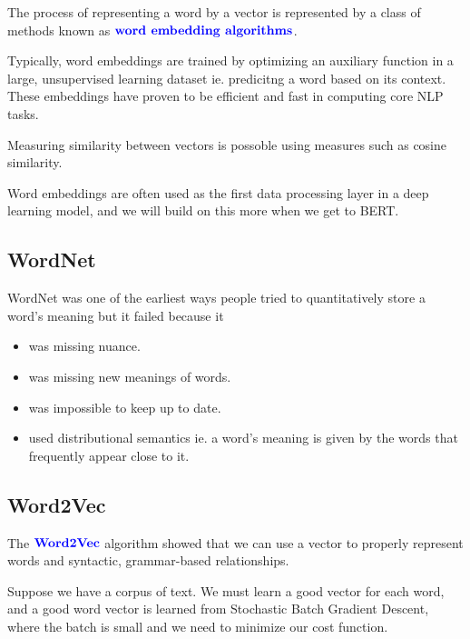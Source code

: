 \documentclass[12pt]{scrartcl}
\begin{document}
\begin{definition}
The process of representing a word by a vector is represented by a class of methods known as $\textbf{\color{blue} word embedding algorithms}$.
\end{definition}

\begin{note}
    Typically, word embeddings are trained by optimizing an auxiliary function in a large, unsupervised learning dataset ie. predicitng a word based on its context. These embeddings have proven to be efficient and fast in computing core NLP tasks.
\end{note}

\begin{note}
    Measuring similarity between vectors is possoble using measures such as cosine similarity.
\end{note}

Word embeddings are often used as the first data processing layer in a deep learning model, and we will build on this more when we get to BERT.

\subsection{WordNet}

WordNet was one of the earliest ways people tried to quantitatively store a word's meaning but it failed because it
\begin{itemize}
    \item was missing nuance.
    \item was missing new meanings of words.
    \item was impossible to keep up to date.
    \item used distributional semantics ie. a word's meaning is given by the words that frequently appear close to it.
\end{itemize}

\subsection{Word2Vec}

\begin{definition}
    The $\textbf{\color{blue} Word2Vec}$ algorithm showed that we can use a vector to properly represent words and syntactic, grammar-based relationships.
\end{definition}

Suppose we have a corpus of text. We must learn a good vector for each word, and a good word vector is learned from Stochastic Batch Gradient Descent, where the batch is small and we need to minimize our cost function.
\end{document}
